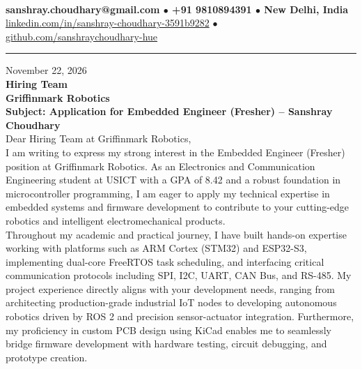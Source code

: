 \documentclass[10pt,a4paper]{article}%
\begin{document}
%
 \vspace{3pt}\\%
\noindent \textbf{\footnotesize sanshray.choudhary@gmail.com $\bullet$ +91 9810894391 $\bullet$ New Delhi, India}\\%
\noindent \href{https://www.linkedin.com/in/sanshray-choudhary-3591b9282}{linkedin.com/in/sanshray-choudhary-3591b9282} $\bullet$ \href{https://github.com/sanshraychoudhary-hue}{github.com/sanshraychoudhary-hue} \vspace{12pt}%
\hrule \vspace{18pt}%

\noindent November 22, 2026 \vspace{12pt}\\%
\noindent \textbf{Hiring Team} \\%
\noindent \textbf{Griffinmark Robotics} \vspace{16pt}\\%

\noindent \textbf{Subject: Application for Embedded Engineer (Fresher) -- Sanshray Choudhary} \vspace{12pt}\\%

\noindent Dear Hiring Team at Griffinmark Robotics, \vspace{8pt}\\%

\noindent I am writing to express my strong interest in the Embedded Engineer (Fresher) position at Griffinmark Robotics. As an Electronics and Communication Engineering student at USICT with a GPA of 8.42 and a robust foundation in microcontroller programming, I am eager to apply my technical expertise in embedded systems and firmware development to contribute to your cutting-edge robotics and intelligent electromechanical products. \vspace{8pt}\\

\noindent Throughout my academic and practical journey, I have built hands-on expertise working with platforms such as ARM Cortex (STM32) and ESP32-S3, implementing dual-core FreeRTOS task scheduling, and interfacing critical communication protocols including SPI, I2C, UART, CAN Bus, and RS-485. My project experience directly aligns with your development needs, ranging from architecting production-grade industrial IoT nodes to developing autonomous robotics driven by ROS 2 and precision sensor-actuator integration. Furthermore, my proficiency in custom PCB design using KiCad enables me to seamlessly bridge firmware development with hardware testing, circuit debugging, and prototype creation. \vspace{8pt}\\
\end{document}

